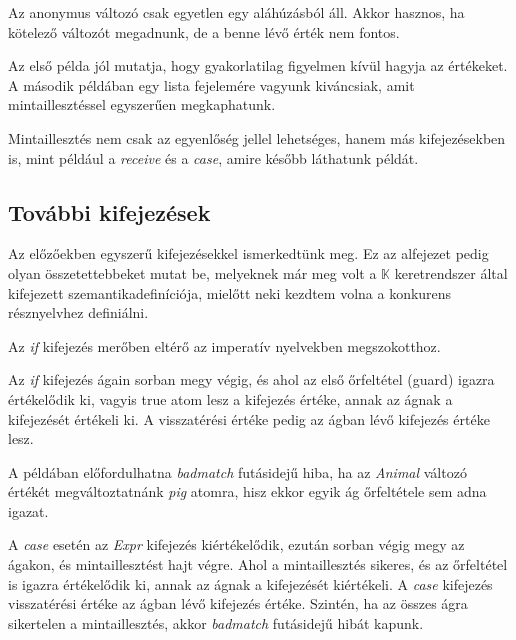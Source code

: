 Az anonymus változó csak egyetlen egy aláhúzásból áll. Akkor hasznos, ha kötelező változót megadnunk, de a benne lévő érték nem fontos.



Az első példa jól mutatja, hogy gyakorlatilag figyelmen kívül hagyja az értékeket. A második példában egy lista fejelemére vagyunk kiváncsiak, amit mintaillesztéssel egyszerűen megkaphatunk.

Mintaillesztés nem csak az egyenlőség jellel lehetséges, hanem más kifejezésekben is, mint például a \textit{receive} és a \textit{case}, amire később láthatunk példát.

\subsection{További kifejezések}

Az előzőekben egyszerű kifejezésekkel ismerkedtünk meg. Ez az alfejezet pedig olyan összetettebbeket mutat be, melyeknek már meg volt a $\mathbb{K}$ keretrendszer által kifejezett szemantikadefiníciója, mielőtt neki kezdtem volna a konkurens résznyelvhez definiálni.

Az \textit{if} kifejezés merőben eltérő az imperatív nyelvekben megszokotthoz.



Az \textit{if} kifejezés ágain sorban megy végig, és ahol az első őrfeltétel (guard) igazra értékelődik ki, vagyis true atom lesz a kifejezés értéke, annak az ágnak a kifejezését értékeli ki. A visszatérési értéke pedig az ágban lévő kifejezés értéke lesz.



A példában előfordulhatna \textit{badmatch} futásidejű hiba, ha az \textit{Animal} változó értékét megváltoztatnánk \textit{pig} atomra, hisz ekkor egyik ág őrfeltétele sem adna igazat.



A \textit{case} esetén az \textit{Expr} kifejezés kiértékelődik, ezután sorban végig megy az ágakon, és mintaillesztést hajt végre. Ahol a mintaillesztés sikeres, és az őrfeltétel is igazra értékelődik ki, annak az ágnak a kifejezését kiértékeli. A \textit{case} kifejezés visszatérési értéke az ágban lévő kifejezés értéke. Szintén, ha az összes ágra sikertelen a mintaillesztés, akkor \textit{badmatch} futásidejű hibát kapunk.

